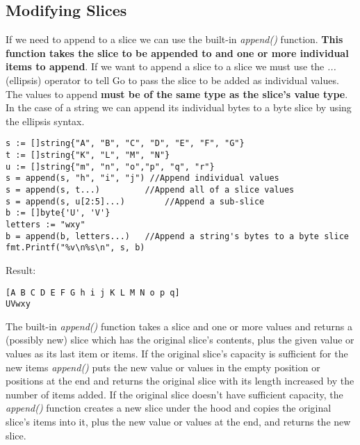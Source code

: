 \documentclass[10pt,letterpaper]{report}
\begin{document}
\subsection{Modifying Slices}
If we need to append to a slice we can use the built-in \textit{append()} function. \textbf{This function takes the slice to be appended to and one or more individual items to append}. If we want to append a slice to a slice we must use the \textit{...} (ellipsis) operator to tell Go to pass the slice to be added as individual values. The values to append \textbf{must be of the same type as the slice's value type}. In the case of a string we can append its individual bytes to a byte slice by using the ellipsis syntax.
\begin{lstlisting}
s := []string{"A", "B", "C", "D", "E", "F", "G"}
t := []string{"K", "L", "M", "N"}
u := []string{"m", "n", "o","p", "q", "r"}
s = append(s, "h", "i", "j") //Append individual values
s = append(s, t...)			//Append all of a slice values
s = append(s, u[2:5]...)		//Append a sub-slice
b := []byte{'U', 'V'}
letters := "wxy"
b = append(b, letters...)	//Append a string's bytes to a byte slice
fmt.Printf("%v\n%s\n", s, b)
\end{lstlisting}
Result:
\begin{lstlisting}
[A B C D E F G h i j K L M N o p q]
UVwxy
\end{lstlisting}
The built-in \textit{append()} function takes a slice and one or more values and returns a (possibly new) slice which has the original slice's contents, plus the given value or values as its last item or items. If the original slice's capacity is sufficient for the new items \textit{append()} puts the new value or values in the empty position or positions at the end and returns the original slice with its length increased by the number of items added. If the original slice doesn't have sufficient capacity, the \textit{append()} function creates a new slice under the hood and copies the original slice's items into it, plus the new value or values at the end, and returns the new slice.
\end{document}
